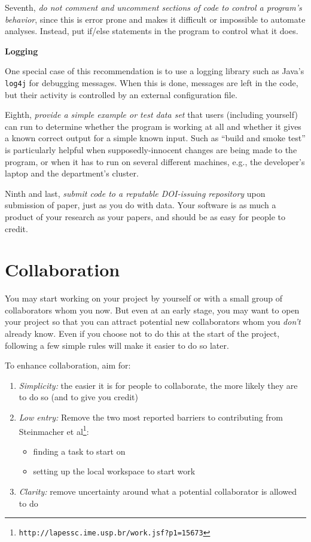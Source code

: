 \documentclass[10pt]{article}
\newcommand{\recommend}[1]{\textit{#1}}
\newcommand{\withurl}[2]{{#1}\footnote{\texttt{#2}}}
\begin{document}
Seventh, \recommend{do not comment and uncomment sections of code to control
a program's behavior}, since this is error prone and makes it difficult
or impossible to automate analyses. Instead, put if/else statements in
the program to control what it does.

\begin{framed}
\noindent \textbf{Logging}

One special case of this recommendation is to use a logging library
such as Java's \texttt{log4j} for debugging messages. When this is
done, messages are left in the code, but their activity is controlled
by an external configuration file.
\end{framed}

Eighth, \recommend{provide a simple example or test data set} that users
(including yourself) can run to determine whether the program is working
at all and whether it gives a known correct output for a simple known
input. Such as ``build and smoke test'' is particularly helpful when
supposedly-innocent changes are being made to the program, or when it
has to run on several different machines, e.g., the developer's laptop
and the department's cluster.

Ninth and last, \recommend{submit code to a reputable DOI-issuing repository}
upon submission of paper, just as you do with data. Your software is as
much a product of your research as your papers, and should be as easy
for people to credit.

\section{Collaboration}\label{collaboration}

You may start working on your project by yourself or with a small group
of collaborators whom you now. But even at an early stage, you may want
to open your project so that you can attract potential new collaborators
whom you \emph{don't} already know. Even if you choose not to do this at
the start of the project, following a few simple rules will make it
easier to do so later.

To enhance collaboration, aim for:

\begin{enumerate}
\item
  \emph{Simplicity:} the easier it is for people to collaborate, the
  more likely they are to do so (and to give you credit)
\item
  \emph{Low entry:} Remove the two most reported barriers to
  contributing from \withurl{Steinmacher et
    al}{http://lapessc.ime.usp.br/work.jsf?p1=15673}:

  \begin{itemize}
  \item
    finding a task to start on
  \item
    setting up the local workspace to start work
  \end{itemize}
\item
  \emph{Clarity:} remove uncertainty around what a potential
  collaborator is allowed to do
\end{enumerate}
\end{document}
